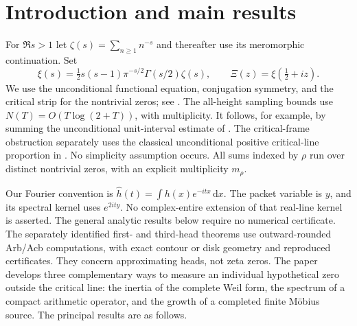 \documentclass[11pt]{article}
\theoremstyle{remark}\newtheorem{remark}[theorem]{Remark}
\newcommand{\dd}{\,\mathrm d}
\begin{document}
\clearpage
\tableofcontents
\clearpage

\section{Introduction and main results}\label{sec:introduction}
For $\Re s>1$ let $\zeta(s)=\sum_{n\ge1}n^{-s}$ and thereafter use its
meromorphic continuation. Set
\[
 \xi(s)=\tfrac12s(s-1)\pi^{-s/2}\Gamma(s/2)\zeta(s),\qquad
 \Xi(z)=\xi(\tfrac12+iz).
\]
We use the unconditional functional equation, conjugation symmetry, and
the critical strip for the nontrivial zeros; see
\cite[\S\S25.2,25.4,25.10]{DLMF}. The all-height sampling bounds use
$N(T)=O(T\log(2+T))$, with multiplicity. It follows, for example,
by summing the unconditional unit-interval estimate of
\cite[Lemma 9.4 and Remark 9.7]{Kedlaya}.
The critical-frame obstruction separately uses the classical
unconditional positive critical-line proportion in
\cite[Theorem 1]{Conrey}. No simplicity assumption occurs.
All sums indexed by $\rho$ run over distinct nontrivial zeros, with an
explicit multiplicity $m_\rho$.

Our Fourier convention is
$\widehat h(t)=\int h(x)e^{-itx}\dd x$.
The packet variable is $y$, and its spectral kernel uses $e^{2ity}$.
No complex-entire extension of that real-line kernel is asserted.
The general analytic results below require no numerical certificate.
The separately identified first- and third-head theorems use outward-rounded
Arb/Acb computations, with exact contour or disk geometry and reproduced
certificates. They concern approximating heads, not zeta zeros.
The paper develops three complementary ways to measure an individual
hypothetical zero outside the critical line: the inertia of the
complete Weil form, the spectrum of a compact arithmetic operator,
and the growth of a completed finite M\"obius source. The principal
results are as follows.
\end{document}
